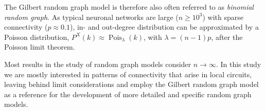 The Gilbert random graph model is therefore also often referred to as
\textit{binomial random graph}. %
As typical neuronal networks are large ($n \geq 10^3$) with sparse
connectivity ($p \approx 0.1$), in- and out-degree distribution can be
approximated by a Poisson distribution, $P^X(k) \approx
\operatorname{Pois}_{\lambda}(k)$, with $\lambda = (n-1)p$, after the
Poisson limit theorem.

Most results in the study of random graph models consider $n\to
\infty$. In this study we are mostly interested in patterns of
connectivity that arise in local circuits, leaving behind limit
considerations and employ the Gilbert random graph model as a
reference for the development of more detailed and specific random
graph models.


